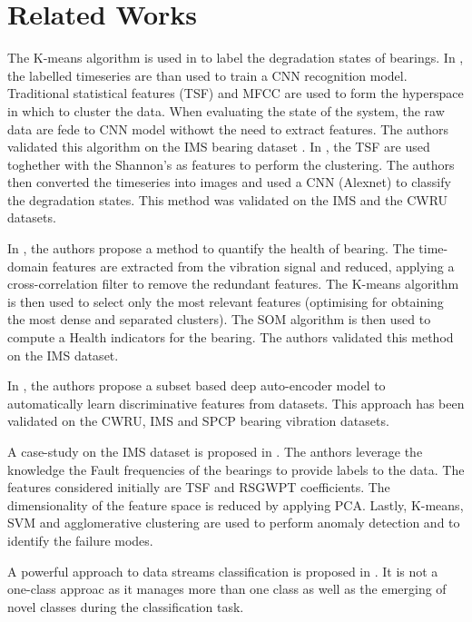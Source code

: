 \section{Related Works}
\label{sec:related_work}


The K-means algorithm is used in \cite{Zhou2019,Pinedo2020} to label the degradation states of bearings.  In \cite{Zhou2019}, the labelled timeseries are than used to train a CNN recognition model. Traditional statistical features (TSF) and MFCC are used to form the hyperspace in which to cluster the data. When evaluating the state of the system, the raw data are fede to CNN model withowt the need to extract features. The authors validated this algorithm on the IMS bearing dataset \cite{IMS_data}. In \cite{Pinedo2020}, the TSF are used toghether with the Shannon's as features to perform the clustering. The authors then converted the timeseries into images and used a CNN (Alexnet) to classify the degradation states. This method was validated on the IMS and the CWRU datasets.

In \cite{Chalouli2017}, the authors propose a method to quantify the health of bearing. The time-domain features are extracted from the vibration signal and reduced, applying a cross-correlation filter to remove the redundant features. The K-means algorithm is then used to select only the most relevant features (optimising for obtaining the most dense and separated clusters). The SOM algorithm is then used to compute a Health indicators for the bearing. The authors validated this method on the IMS dataset.

In \cite{ZHANG2018}, the authors propose a subset based deep auto-encoder model to automatically learn discriminative features from datasets. This approach has been validated on the CWRU, IMS and SPCP bearing vibration datasets.

A case-study on the IMS dataset is proposed in \cite{Gattino2023}. The anthors leverage the knowledge the Fault frequencies of the bearings to provide labels to the data. The features considered initially are TSF and RSGWPT coefficients. The dimensionality of the feature space is reduced by applying PCA. Lastly, K-means, SVM and agglomerative clustering are used to perform anomaly detection and to identify the failure modes.

A powerful approach to data streams classification is proposed in \cite{Masud2011}. It is not a one-class approac as it manages more than one  class as well as the emerging of novel classes during the classification task. 


